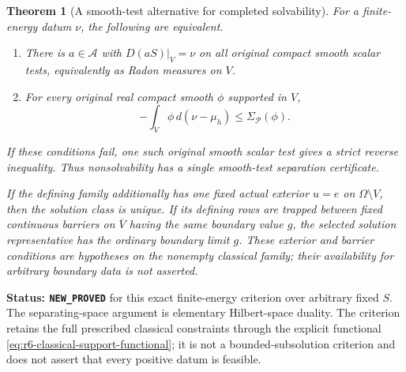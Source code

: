 \documentclass[11pt,a4paper]{article}
\numberwithin{equation}{section}
\newtheorem{theorem}{Theorem}[section]
\theoremstyle{definition}
\theoremstyle{remark}
\begin{document}
\begin{theorem}[A smooth-test alternative for completed solvability]
\label{thm:r6-energy-dirichlet-alternative}
For a finite-energy datum $\nu$, the following are equivalent.
\begin{enumerate}
\item There is $a\in\mathscr A$ with $D(aS)|_V=\nu$ on all original
compact smooth scalar tests, equivalently as Radon measures on $V$.
\item For every original real compact smooth $\phi$ supported in $V$,
\begin{equation}
       -\int_V\phi\,d(\nu-\mu_h)
                         \le\Sigma_{\mathscr P}(\phi).
 \label{eq:r6-smooth-test-feasibility}
\end{equation}
\end{enumerate}
If these conditions fail, one such original smooth scalar test gives a
strict reverse inequality. Thus nonsolvability has a single smooth-test
separation certificate.

If the defining family additionally has one fixed actual exterior
$u=e$ on $\Omega\setminus V$, then the solution class is unique.
If its defining rows are trapped between fixed continuous barriers on
$\overline V$ having the same boundary value $g$, the selected solution
representative has the ordinary boundary limit $g$. These exterior and
barrier conditions are hypotheses on the nonempty classical family;
their availability for arbitrary boundary data is not asserted.
\end{theorem}

\noindent\textbf{Status: \texttt{NEW\_PROVED}} for this exact
finite-energy criterion over arbitrary fixed $S$. The separating-space
argument is elementary Hilbert-space duality. The criterion retains the
full prescribed classical constraints through the explicit functional
\eqref{eq:r6-classical-support-functional}; it is not a bounded-subsolution
criterion and does not assert that every positive datum is feasible.
\end{document}
